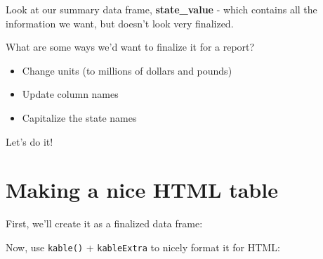 \documentclass[]{book}
\newenvironment{Shaded}{\begin{snugshade}}{\end{snugshade}}
\newcommand{\DataTypeTok}[1]{\textcolor[rgb]{0.13,0.29,0.53}{#1}}
\newcommand{\DecValTok}[1]{\textcolor[rgb]{0.00,0.00,0.81}{#1}}
\newcommand{\FloatTok}[1]{\textcolor[rgb]{0.00,0.00,0.81}{#1}}
\newcommand{\KeywordTok}[1]{\textcolor[rgb]{0.13,0.29,0.53}{\textbf{#1}}}
\newcommand{\NormalTok}[1]{#1}
\newcommand{\OperatorTok}[1]{\textcolor[rgb]{0.81,0.36,0.00}{\textbf{#1}}}
\newcommand{\OtherTok}[1]{\textcolor[rgb]{0.56,0.35,0.01}{#1}}
\newcommand{\StringTok}[1]{\textcolor[rgb]{0.31,0.60,0.02}{#1}}
\providecommand{\tightlist}{%
  \setlength{\itemsep}{0pt}\setlength{\parskip}{0pt}}
\begin{document}
Look at our summary data frame, \textbf{state\_value} - which contains all the information we want, but doesn't look very finalized.

What are some ways we'd want to finalize it for a report?

\begin{itemize}
\tightlist
\item
  Change units (to millions of dollars and pounds)
\item
  Update column names
\item
  Capitalize the state names
\end{itemize}

Let's do it!

\hypertarget{making-a-nice-html-table}{%
\section{Making a nice HTML table}\label{making-a-nice-html-table}}

First, we'll create it as a finalized data frame:

\begin{Shaded}
\end{Shaded}

Now, use \texttt{kable()} + \texttt{kableExtra} to nicely format it for HTML:

\begin{Shaded}
\end{Shaded}
\end{document}
